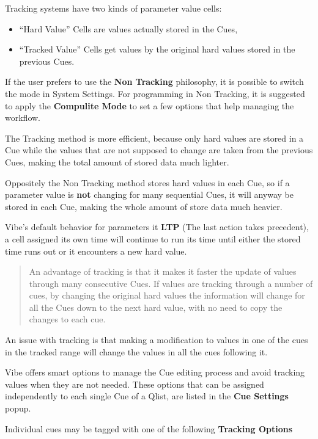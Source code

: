 \documentclass[
]{article}
\begin{document}
Tracking systems have two kinds of parameter value cells:

\begin{itemize}
\item
  ``Hard Value'' Cells are values actually stored in the Cues,
\item
  ``Tracked Value'' Cells get values by the original hard values stored in the previous Cues.
\end{itemize}

If the user prefers to use the \textbf{Non Tracking} philosophy, it is possible to switch the mode in System Settings. For programming in Non Tracking, it is suggested to apply the \textbf{Compulite Mode} to set a few options that help managing the workflow.

The Tracking method is more efficient, because only hard values are stored in a Cue while the values that are not supposed to change are taken from the previous Cues, making the total amount of stored data much lighter.

Oppositely the Non Tracking method stores hard values in each Cue, so if a parameter value is \textbf{not} changing for many sequential Cues, it will anyway be stored in each Cue, making the whole amount of store data much heavier.

Vibe's default behavior for parameters it \textbf{LTP} (The last action takes precedent), a cell assigned its own time will continue to run its time until either the stored time runs out or it encounters a new hard value.

\begin{quote}
An advantage of tracking is that it makes it faster the update of values through many consecutive Cues. If values are tracking through a number of cues, by changing the original hard values the information will change for all the Cues down to the next hard value, with no need to copy the changes to each cue.
\end{quote}

An issue with tracking is that making a modification to values in one of the cues in the tracked range will change the values in all the cues following it.

Vibe offers smart options to manage the Cue editing process and avoid tracking values when they are not needed. These options that can be assigned independently to each single Cue of a Qlist, are listed in the \textbf{Cue Settings} popup.

Individual cues may be tagged with one of the following \textbf{Tracking Options}
\end{document}
